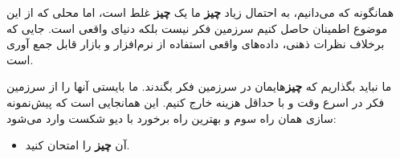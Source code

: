 همانگونه که می‌دانیم، به احتمال زیاد \textbf{چیز} ما یک \textbf{چیز} غلط
است، اما محلی که از این موضوع اطمینان حاصل کنیم سرزمین فکر نیست بلکه
دنیای واقعی است. جایی که برخلاف نظرات ذهنی، داده‌های واقعی استفاده از
نرم‌افزار و بازار قابل جمع آوری است.

ما نباید بگذاریم که \textbf{چیز}هایمان در سرزمین فکر بگندند. ما بایستی
آنها را از سرزمین فکر در اسرع وقت و با حداقل هزینه خارج کنیم. این
همانجایی است که پیش‌نمونه سازی همان راه سوم و بهترین راه برخورد با دیو
شکست وارد می‌شود:

\begin{itemize}

\item
  آن \textbf{چیز} را امتحان کنید.
\end{itemize}

